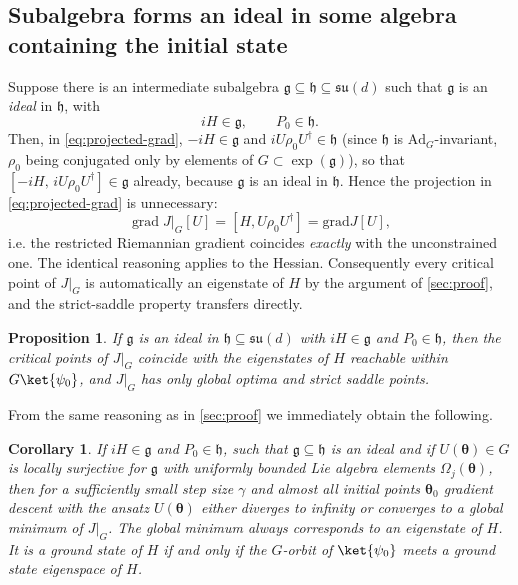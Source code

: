 \documentclass{article}
\renewcommand{\vec}[1]{\ensuremath{\boldsymbol{#1}}}
\newtheorem{proposition}{Proposition}
\newtheorem{corollary}{Corollary}
\begin{document}
\subsection{Subalgebra forms an ideal in some algebra containing the initial state}
Suppose there is an intermediate subalgebra $\mathfrak g\subseteq\mathfrak h\subseteq\mathfrak{su}(d)$ such that $\mathfrak g$ is an \emph{ideal} in $\mathfrak h$, with
\begin{equation}
iH\in\mathfrak g, \qquad P_0\in\mathfrak h.
\end{equation}
Then, in \cref{eq:projected-grad}, $-iH\in\mathfrak g$ and $iU\rho_0U^\dagger\in\mathfrak h$ (since $\mathfrak h$ is $\mathrm{Ad}_G$-invariant, $\rho_0$ being conjugated only by elements of $G\subset \exp(\mathfrak g)$), so that $[-iH,\,iU\rho_0U^\dagger]\in\mathfrak g$ already, because $\mathfrak g$ is an ideal in $\mathfrak h$.
Hence the projection in \cref{eq:projected-grad} is unnecessary:
\begin{equation}
\operatorname{grad} J\vert_G[U] = [H, U\rho_0U^\dagger] = \mathrm{grad} J[U],
\end{equation}
i.e. the restricted Riemannian gradient coincides \emph{exactly} with the unconstrained one.
The identical reasoning applies to the Hessian.
Consequently every critical point of $J\vert_G$ is automatically an eigenstate of $H$ by the argument of \cref{sec:proof}, and the strict-saddle property transfers directly.

\begin{proposition}
\label{prop:ideal-case}
If $\mathfrak g$ is an ideal in $\mathfrak h\subseteq\mathfrak{su}(d)$ with $iH\in\mathfrak g$ and $P_0\in\mathfrak h$, then the critical points of $J\vert_G$ coincide with the eigenstates of $H$ reachable within $G\ket{\psi_0}$, and $J\vert_G$ has only global optima and strict saddle points.
\end{proposition}
From the same reasoning as in \cref{sec:proof} we immediately obtain the following.
\begin{corollary}
If $iH\in\mathfrak g$ and $P_0\in\mathfrak h$, such that \(\mathfrak{g} \subseteq \mathfrak{h}\) is an ideal and if $U(\boldsymbol\theta)\in G$ is locally surjective for $\mathfrak g$ with uniformly bounded Lie algebra elements $\Omega_j(\vec{\theta})$, then for a sufficiently small step size $\gamma$ and almost all initial points $\vec{\theta}_0$ gradient descent with the ansatz $U(\vec{\theta})$ either diverges to infinity or converges to a global minimum of $J\vert_G$. The global minimum always corresponds to an eigenstate of \(H\). It is a ground state of $H$ if and only if the $G$-orbit of $\ket{\psi_0}$ meets a ground state eigenspace of $H$.
\end{corollary}
\end{document}
